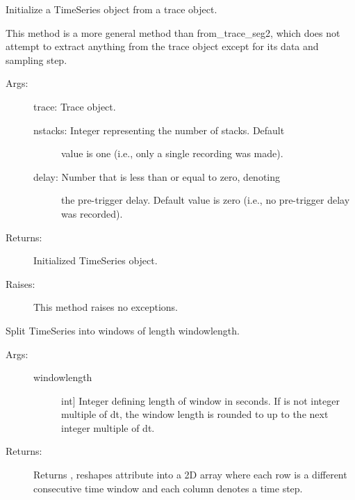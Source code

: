 \documentclass[letterpaper,10pt,english]{sphinxmanual}
\begin{document}
\begin{fulllineitems}
\begin{fulllineitems}
Initialize a TimeSeries object from a trace object.

This method is a more general method than from\_trace\_seg2, which
does not attempt to extract anything from the trace object 
except for its data and sampling step.
\begin{description}
\item[{Args:}] \leavevmode
trace: Trace object.
\begin{description}
\item[{nstacks: Integer representing the number of stacks. Default }] \leavevmode
value is one (i.e., only a single recording was made).

\item[{delay: Number that is less than or equal to zero, denoting}] \leavevmode
the pre-trigger delay. Default value is zero (i.e., no
pre-trigger delay was recorded).

\end{description}

\item[{Returns:}] \leavevmode
Initialized TimeSeries object.

\item[{Raises:}] \leavevmode
This method raises no exceptions.

\end{description}

\end{fulllineitems}



\begin{fulllineitems}
Split TimeSeries into windows of length windowlength.
\begin{description}
\item[{Args:}] \leavevmode\begin{description}
\item[{windowlength}] \leavevmode{[}int{]}
Integer defining length of window in seconds. If 
 is not integer multiple of dt, the 
window length is rounded to up to the next integer
multiple of dt.

\end{description}

\item[{Returns:}] \leavevmode
Returns , reshapes attribute  into a 2D array 
where each row is a different consecutive time window and 
each column denotes a time step.


\end{description}
\end{fulllineitems}
\end{fulllineitems}
\end{document}
